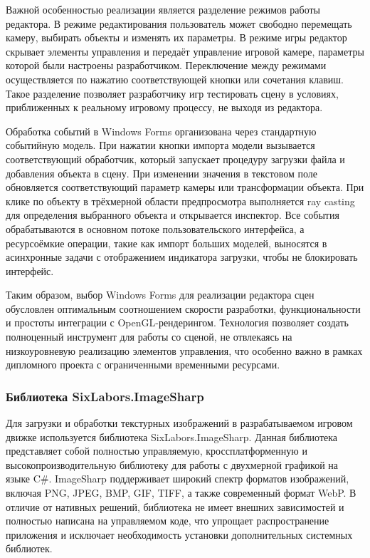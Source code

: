Важной особенностью реализации является разделение режимов работы редактора. В режиме редактирования пользователь может свободно перемещать камеру, выбирать объекты и изменять их параметры. В режиме игры редактор скрывает элементы управления и передаёт управление игровой камере, параметры которой были настроены разработчиком. Переключение между режимами осуществляется по нажатию соответствующей кнопки или сочетания клавиш. Такое разделение позволяет разработчику игр тестировать сцену в условиях, приближенных к реальному игровому процессу, не выходя из редактора.

Обработка событий в Windows Forms организована через стандартную событийную модель. При нажатии кнопки импорта модели вызывается соответствующий обработчик, который запускает процедуру загрузки файла и добавления объекта в сцену. При изменении значения в текстовом поле обновляется соответствующий параметр камеры или трансформации объекта. При клике по объекту в трёхмерной области предпросмотра выполняется ray casting для определения выбранного объекта и открывается инспектор. Все события обрабатываются в основном потоке пользовательского интерфейса, а ресурсоёмкие операции, такие как импорт больших моделей, выносятся в асинхронные задачи с отображением индикатора загрузки, чтобы не блокировать интерфейс.

Таким образом, выбор Windows Forms для реализации редактора сцен обусловлен оптимальным соотношением скорости разработки, функциональности и простоты интеграции с OpenGL-рендерингом. Технология позволяет создать полноценный инструмент для работы со сценой, не отвлекаясь на низкоуровневую реализацию элементов управления, что особенно важно в рамках дипломного проекта с ограниченными временными ресурсами.

\subsubsection{Библиотека SixLabors.ImageSharp}
Для загрузки и обработки текстурных изображений в разрабатываемом игровом движке используется библиотека SixLabors.ImageSharp. Данная библиотека представляет собой полностью управляемую, кроссплатформенную и высокопроизводительную библиотеку для работы с двухмерной графикой на языке C\#. ImageSharp поддерживает широкий спектр форматов изображений, включая PNG, JPEG, BMP, GIF, TIFF, а также современный формат WebP. В отличие от нативных решений, библиотека не имеет внешних зависимостей и полностью написана на управляемом коде, что упрощает распространение приложения и исключает необходимость установки дополнительных системных библиотек.

